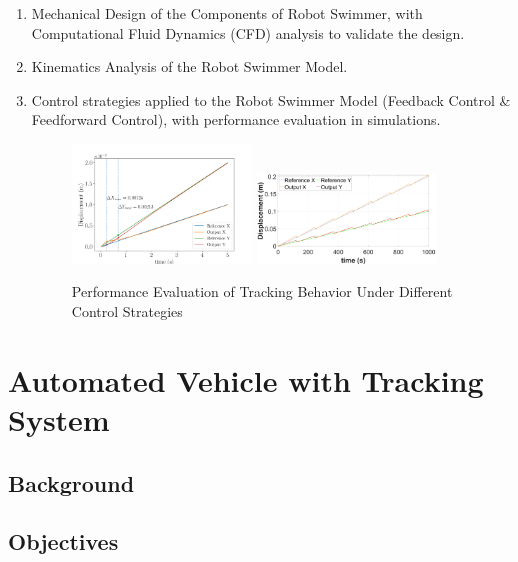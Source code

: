 \documentclass[12pt]{article}
\begin{document}
\begin{enumerate}

    \item {Mechanical Design of the Components of Robot Swimmer, with Computational Fluid Dynamics (CFD) analysis to validate the design.}
    \item {Kinematics Analysis of the Robot Swimmer Model.}
    \item {Control strategies applied to the Robot Swimmer Model (Feedback Control \& Feedforward Control), with performance evaluation in simulations.}

    \begin{figure}[H]
        \centering
        \includegraphics[width=0.45\textwidth]{portfolio/fig01_TrackingBehavior.png}
        \includegraphics[width=0.45\textwidth]{portfolio/feedforward_track.png}
        \caption{Performance Evaluation of Tracking Behavior Under Different Control Strategies}
        \label{Control-RobotSwimmer}
    \end{figure}
\end{enumerate}

\newpage

\section{Automated Vehicle with Tracking System}


\subsection{Background}

\subsection{Objectives}
\end{document}
